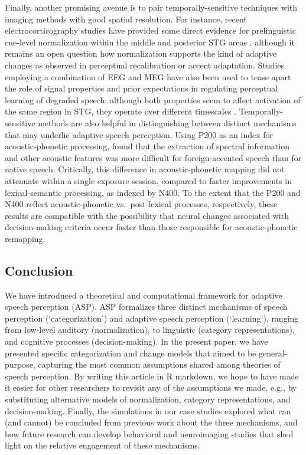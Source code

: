 \documentclass[
  11pt,
  man,floatsintext]{apa6}
\begin{document}
Finally, another promising avenue is to pair temporally-sensitive techniques with imaging methods with good spatial resolution. For instance, recent electrocorticography studies have provided some direct evidence for prelinguistic cue-level normalization within the middle and posterior STG areas \autocites{johnson-sjerps2021,tang2017}[see also][]{sjerps2019}, although it remains an open question how normalization supports the kind of adaptive changes as observed in perceptual recalibration or accent adaptation. Studies employing a combination of EEG and MEG have also been used to tease apart the role of signal properties and prior expectations in regulating perceptual learning of degraded speech: although both properties seem to affect activation of the same region in STG, they operate over different timescales \autocite{sohoglu-davis2016,sohoglu-davis2020}. Temporally-sensitive methods are also helpful in distinguishing between distinct mechanisms that may underlie adaptive speech perception. Using P200 as an index for acoustic-phonetic processing, \textcite{romero2015} found that the extraction of spectral information and other acoustic features was more difficult for foreign-accented speech than for native speech. Critically, this difference in acoustic-phonetic mapping did not attenuate within a single exposure session, compared to faster improvements in lexical-semantic processing, as indexed by N400. To the extent that the P200 and N400 reflect acoustic-phonetic vs.~post-lexical processes, respectively, these results are compatible with the possibility that neural changes associated with decision-making criteria \autocites[driven by the prediction error experienced during lexical processing, cf.][]{delaney2019,kuperberg2016} occur faster than those responsible for acoustic-phonetic remapping.

\subsection{Conclusion}\label{conclusion}

We have introduced a theoretical and computational framework for adaptive speech perception (ASP). ASP formalizes three distinct mechanisms of speech perception (`categorization') and adaptive speech perception (`learning'), ranging from low-level auditory (normalization), to linguistic (category representations), and cognitive processes (decision-making). In the present paper, we have presented specific categorization and change models that aimed to be general-purpose, capturing the most common assumptions shared among theories of speech perception. By writing this article in R markdown, we hope to have made it easier for other researchers to revisit any of the assumptions we made, e.g., by substituting alternative models of normalization, category representations, and decision-making. Finally, the simulations in our case studies explored what can (and cannot) be concluded from previous work about the three mechanisms, and how future research can develop behavioral and neuroimaging studies that shed light on the relative engagement of these mechanisms.
\end{document}
